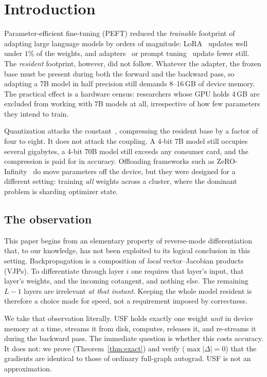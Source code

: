 \documentclass[preprint,12pt]{elsarticle}
\newcommand{\usf}{USF}
\begin{document}
\section{Introduction}
\label{sec:intro}

Parameter-efficient fine-tuning (PEFT) reduced the \emph{trainable} footprint of
adapting large language models by orders of magnitude: LoRA~\cite{hu2022lora} updates well under
$1\%$ of the weights, and adapters~\cite{houlsby2019adapters} or prompt
tuning~\cite{lester2021prompt} update fewer still. The \emph{resident} footprint, however, did not
follow. Whatever the adapter, the frozen base must be present during both the forward and the
backward pass, so adapting a 7B model in half precision still demands 8--16\,GB of device memory.
The practical effect is a hardware census: researchers whose GPU holds 4\,GB are excluded from
working with 7B models at all, irrespective of how few parameters they intend to train.

Quantization attacks the constant~\cite{dettmers2023qlora,dettmers2022int8}, compressing the
resident base by a factor of four to eight. It does not attack the coupling. A 4-bit 7B model
still occupies several gigabytes, a 4-bit 70B model still exceeds any consumer card, and the
compression is paid for in accuracy. Offloading frameworks such as
ZeRO-Infinity~\cite{rajbhandari2021zeroinfinity} do move parameters off the device, but they were
designed for a different setting: training \emph{all} weights across a cluster, where the dominant
problem is sharding optimizer state.

\subsection{The observation}

This paper begins from an elementary property of reverse-mode differentiation
\cite{griewank2008evaluating,baydin2018autodiff} that, to our knowledge, has not been exploited to
its logical conclusion in this setting. Backpropagation is a composition of \emph{local}
vector--Jacobian products (VJPs). To differentiate through layer $i$ one requires that layer's
input, that layer's weights, and the incoming cotangent, and nothing else. The remaining $L-1$
layers are irrelevant \emph{at that instant}. Keeping the whole model resident is therefore a
choice made for speed, not a requirement imposed by correctness.

We take that observation literally. \usf{} holds exactly one weight \emph{unit} in device memory at
a time, streams it from disk, computes, releases it, and re-streams it during the backward pass.
The immediate question is whether this costs accuracy. It does not: we prove
(Theorem~\ref{thm:exact}) and verify ($\max|\Delta|=0$) that the gradients are identical to those of
ordinary full-graph autograd. \usf{} is not an approximation.
\end{document}
